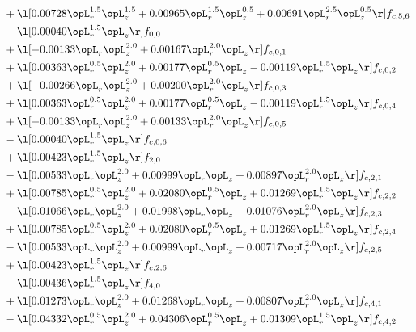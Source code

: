 \begin{alignat}{2}
& + \l[  0.00728 \opL_r^{1.5} \opL_z^{1.5} +  0.00965 \opL_r^{1.5} \opL_z^{0.5} +  0.00691 \opL_r^{2.5} \opL_z^{0.5}  \r] f_{c,5,6} \nonumber \\ 
& - \l[  0.00040 \opL_r^{1.5} \opL_z  \r] f_{0,0} \nonumber \\ 
& + \l[  -0.00133 \opL_r \opL_z^{2.0} +  0.00167 \opL_r^{2.0} \opL_z  \r] f_{c,0,1} \nonumber \\ 
& + \l[  0.00363 \opL_r^{0.5} \opL_z^{2.0} +  0.00177 \opL_r^{0.5} \opL_z   -0.00119 \opL_r^{1.5} \opL_z  \r] f_{c,0,2} \nonumber \\ 
& + \l[  -0.00266 \opL_r \opL_z^{2.0} +  0.00200 \opL_r^{2.0} \opL_z  \r] f_{c,0,3} \nonumber \\ 
& + \l[  0.00363 \opL_r^{0.5} \opL_z^{2.0} +  0.00177 \opL_r^{0.5} \opL_z   -0.00119 \opL_r^{1.5} \opL_z  \r] f_{c,0,4} \nonumber \\ 
& + \l[  -0.00133 \opL_r \opL_z^{2.0} +  0.00133 \opL_r^{2.0} \opL_z  \r] f_{c,0,5} \nonumber \\ 
& - \l[  0.00040 \opL_r^{1.5} \opL_z  \r] f_{c,0,6} \nonumber \\ 
& + \l[  0.00423 \opL_r^{1.5} \opL_z  \r] f_{2,0} \nonumber \\ 
& - \l[  0.00533 \opL_r \opL_z^{2.0} +  0.00999 \opL_r \opL_z +  0.00897 \opL_r^{2.0} \opL_z  \r] f_{c,2,1} \nonumber \\ 
& + \l[  0.00785 \opL_r^{0.5} \opL_z^{2.0} +  0.02080 \opL_r^{0.5} \opL_z +  0.01269 \opL_r^{1.5} \opL_z  \r] f_{c,2,2} \nonumber \\ 
& - \l[  0.01066 \opL_r \opL_z^{2.0} +  0.01998 \opL_r \opL_z +  0.01076 \opL_r^{2.0} \opL_z  \r] f_{c,2,3} \nonumber \\ 
& + \l[  0.00785 \opL_r^{0.5} \opL_z^{2.0} +  0.02080 \opL_r^{0.5} \opL_z +  0.01269 \opL_r^{1.5} \opL_z  \r] f_{c,2,4} \nonumber \\ 
& - \l[  0.00533 \opL_r \opL_z^{2.0} +  0.00999 \opL_r \opL_z +  0.00717 \opL_r^{2.0} \opL_z  \r] f_{c,2,5} \nonumber \\ 
& + \l[  0.00423 \opL_r^{1.5} \opL_z  \r] f_{c,2,6} \nonumber \\ 
& - \l[  0.00436 \opL_r^{1.5} \opL_z  \r] f_{4,0} \nonumber \\ 
& + \l[  0.01273 \opL_r \opL_z^{2.0} +  0.01268 \opL_r \opL_z +  0.00807 \opL_r^{2.0} \opL_z  \r] f_{c,4,1} \nonumber \\ 
& - \l[  0.04332 \opL_r^{0.5} \opL_z^{2.0} +  0.04306 \opL_r^{0.5} \opL_z +  0.01309 \opL_r^{1.5} \opL_z  \r] f_{c,4,2} \nonumber \\ 

\end{alignat}
